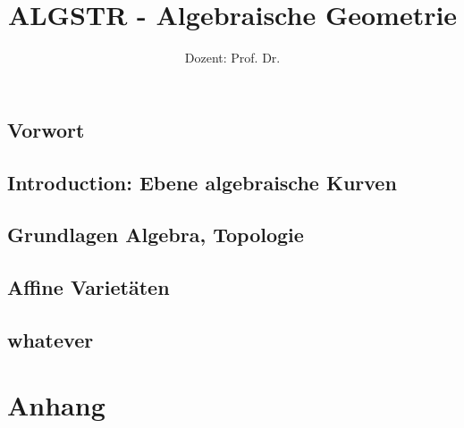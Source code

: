 \documentclass[ngerman,a4paper,order=firstname]{mathscript}
\title{\textbf{ALGSTR - Algebraische Geometrie}}
\author{Dozent: Prof. Dr. \person{Arno Fehm}}
\begin{document}
\pagestyle{plain}

\maketitle

\hypertarget{tocpage}{}
\tableofcontents
{}

\pagebreak
{}
\pagestyle{fancy}
\setcounter{chapter}{0}
\chapter*{Vorwort}

\chapter{Introduction: Ebene algebraische Kurven}

\chapter{Grundlagen Algebra, Topologie}

\chapter{Affine Varietäten}

\chapter{whatever}
%
%
%

\part*{Anhang}
\appendix

\nocite{*}
%



\printindex
\end{document}
